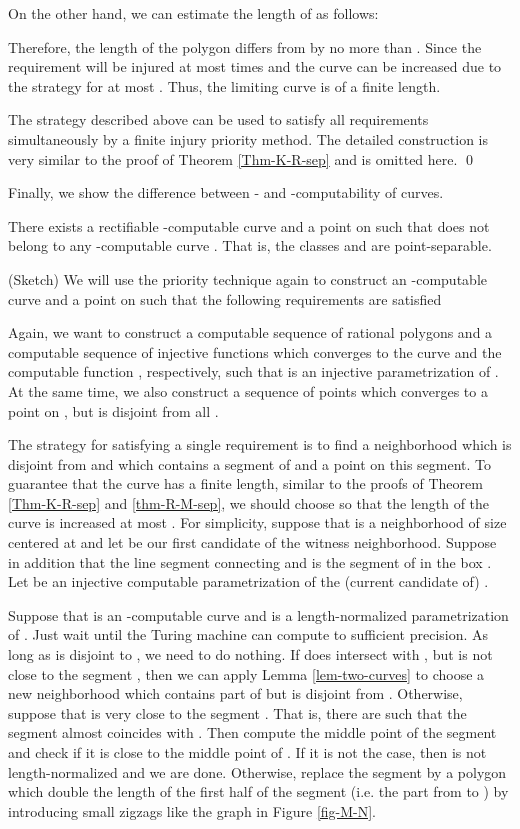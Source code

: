 \documentclass{LMCS}
\theoremstyle{plain}
\begin{document}
On the other hand, we can estimate the length of  as follows:

Therefore, the length of the polygon  differs from  by no more than . Since the requirement  will be injured at most  times and the curve can be increased due to the strategy for  at most . Thus, the limiting curve is of a finite length.

The strategy described above can be used to satisfy all requirements  simultaneously by a finite injury priority method. The detailed construction is very similar to the proof of Theorem \ref{Thm-K-R-sep} and is omitted here.
\qed

Finally, we show the difference between - and -computability of curves.

\begin{thm}\label{thm-M-N-sep}
There exists a rectifiable  -computable curve  and a point  on  such that  does not belong to any -computable curve . That is, the classes  and  are point-separable.
\end{thm}
\proof (Sketch) We will use the priority technique again to construct an -computable curve  and a point  on  such that the following requirements are satisfied

Again, we want to construct a computable sequence  of rational polygons and a computable sequence  of injective functions which converges to the curve  and the computable function , respectively, such that  is an injective parametrization of . At the same time, we also construct a sequence  of points which converges to a point  on , but  is disjoint from all .

The strategy for satisfying a single requirement  is to find a neighborhood  which is disjoint from  and which contains a segment of  and a point  on this segment. To guarantee that the curve  has a finite length, similar to the proofs of Theorem \ref{Thm-K-R-sep} and \ref{thm-R-M-sep}, we should choose  so that the length of the curve is increased at most  . For simplicity, suppose that  is a neighborhood of size  centered at  and let  be our first candidate of the witness neighborhood. Suppose in addition that the line segment  connecting  and  is the segment of  in the box . Let  be an injective computable parametrization of the (current candidate of) .

Suppose that  is an -computable curve and  is a length-normalized parametrization of . Just wait until the Turing machine  can compute   to sufficient precision. As long as  is disjoint to , we need to do nothing. If  does intersect with , but is not close to the segment , then we can apply Lemma \ref{lem-two-curves} to choose a new neighborhood  which contains part of  but is disjoint from . Otherwise, suppose that  is very close to the segment . That is, there are  such that the segment  almost coincides with . Then compute the middle point  of the segment   and check if it is close to the middle point of . If it is not the case, then  is not length-normalized and we are done. Otherwise, replace the segment  by a polygon  which double the length of the first half of the segment  (i.e. the part from  to ) by introducing small zigzags like the graph in Figure \ref{fig-M-N}.
\end{document}
